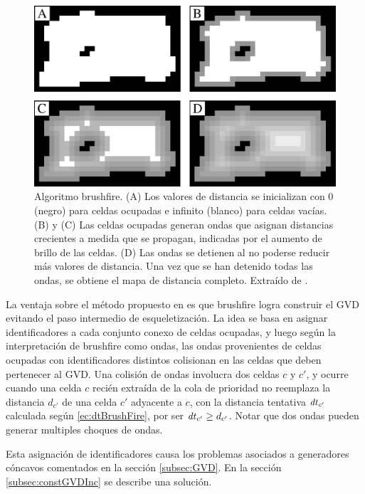 \begin{figure}[H]
  \center
  \includegraphics[width=1\linewidth]{imagenes/wavesBrush2Rows.png}
  \caption[Algoritmo brushfire.]{Algoritmo brushfire. (A) Los valores de distancia se inicializan con 0 (negro) para celdas ocupadas e infinito (blanco) para celdas vacías. (B) y (C) Las celdas ocupadas generan ondas que asignan distancias crecientes a medida que se propagan, indicadas por el aumento de brillo de las celdas. (D) Las ondas se detienen al no poderse reducir más valores de distancia. Una vez que se han detenido todas las ondas, se obtiene el mapa de distancia completo. Extraído de \cite{Lau2013}.}\label{fig:wavesBrush}
\end{figure} 

La ventaja sobre el método propuesto en \cite{wurm2008coordinated} es
que brushfire logra construir el GVD evitando el paso intermedio de
esqueletización. La idea se basa en asignar identificadores a cada
conjunto conexo de celdas ocupadas, y luego según la interpretación de
brushfire como ondas, las ondas provenientes de celdas ocupadas con
identificadores distintos colisionan en las celdas que deben pertenecer
al GVD. Una colisión de ondas involucra dos celdas $c$ y $c'$, y ocurre cuando
una celda $c$ recién extraída de la cola de prioridad no reemplaza la distancia
$d_{c'}$ de una celda $c'$ adyacente a $c$, con la distancia tentativa $\mathit{dt}_{c'}$
calculada según \eqref{ec:dtBrushFire}, por ser $\mathit{dt}_{c'}\geq d_{c'}$.
Notar que dos ondas pueden generar multiples choques de ondas.  

Esta asignación de identificadores causa los problemas asociados a
generadores cóncavos comentados en la sección \ref{subsec:GVD}. En la sección
\ref{subsec:constGVDInc} se describe una solución. 

